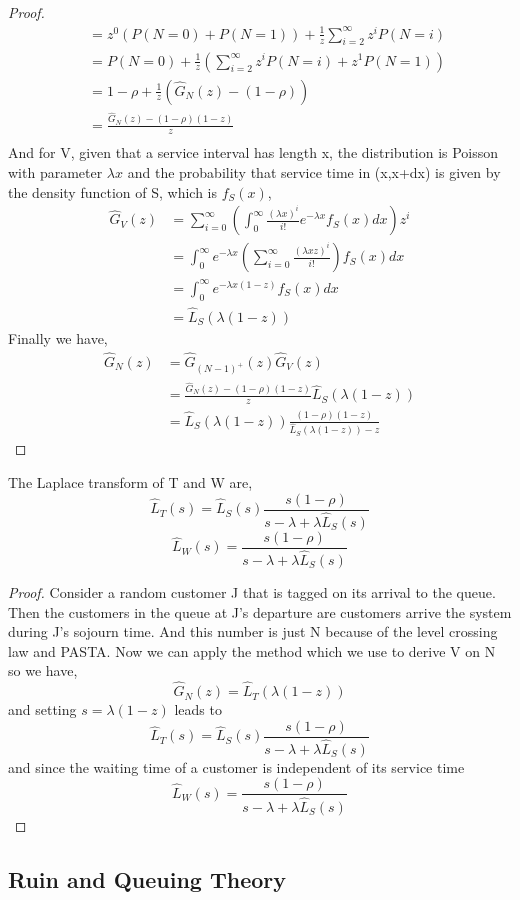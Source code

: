 \documentclass[project2.tex]{subfiles}
\begin{document}
\begin{proof}
\begin{align*}
&=z^0(P(N=0)+P(N=1))+\frac{1}{z}\sum_{i=2}^\infty z^iP(N=i)\\\
&=P(N=0)+\frac{1}{z}(\sum_{i=2}^\infty z^iP(N=i)+z^1P(N=1))\\
&=1-\rho +\frac{1}{z}(\hat{G}_N(z)-(1-\rho))\\
&=\frac{\hat{G}_N(z)-(1-\rho)(1-z)}{z}\\
\end{align*}
And for V, given that a service interval has length x, the distribution is Poisson with parameter $\lambda x$ and the probability that service time in (x,x+dx) is given by the density function of S, which is $f_S(x)$,
\begin{align*}
\hat{G}_V(z)&=\sum_{i=0}^\infty(\int_0^\infty\frac{(\lambda x)^i}{i!}e^{-\lambda x}f_S(x)dx)z^i\\
&=\int_0^\infty e^{-\lambda x}(\sum_{i=0}^\infty\frac{(\lambda xz)^i}{i!})f_S(x)dx\\
&=\int_0^\infty e^{-\lambda x(1-z)}f_S(x)dx\\
&=\hat{L}_S(\lambda(1-z))
\end{align*}
Finally we have,
\begin{align*}
\hat{G}_N(z)&=\hat{G}_{(N-1)^+}(z)\hat{G}_V(z)\\
&=\frac{\hat{G}_N(z)-(1-\rho)(1-z)}{z}\hat{L}_S(\lambda(1-z))\\
&=\hat{L}_S(\lambda(1-z))\frac{(1-\rho)(1-z)}{\hat{L}_S(\lambda(1-z))-z}
\end{align*}
\end{proof}
\begin{lemma}The Laplace transform of T and W are,
$$\hat{L}_T(s)=\hat{L}_S(s)\frac{s(1-\rho)}{s-\lambda+\lambda\hat{L}_S(s)}$$ 
$$\hat{L}_W(s)=\frac{s(1-\rho)}{s-\lambda+\lambda\hat{L}_S(s)}$$ 
\end{lemma}
\begin{proof}
Consider a random customer J that is tagged on its arrival to the queue. Then the customers in the queue at J's departure are customers arrive the system during J's  sojourn time. And this number is just N because of the level crossing law and PASTA. Now we can apply the method which we use to derive V on N so we have, $$\hat{G}_N(z)=\hat{L}_T(\lambda(1-z))$$ and setting $s=\lambda(1-z)$ leads to $$\hat{L}_T(s)=\hat{L}_S(s)\frac{s(1-\rho)}{s-\lambda+\lambda\hat{L}_S(s)}$$ and since the waiting time of a customer is independent of its service time 
$$\hat{L}_W(s)=\frac{s(1-\rho)}{s-\lambda+\lambda\hat{L}_S(s)}$$
\end{proof}    
\subsection{Ruin and Queuing Theory}
\end{document}
